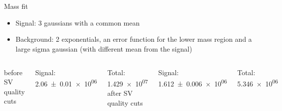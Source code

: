 \section{}

\begin{frame}{Mass fit}
	\begin{block}{}
		\begin{itemize}
			\item Signal: 3 gaussians with a common mean
			\item Background: 2 exponentials, an error function for the lower mass region and a large sigma gaussian (with different mean from the signal)
		\end{itemize}
	\end{block}
	\vspace{0.3cm}
	
	\begin{columns}[c]
			\centering
			before SV quality cuts
			
			
			Signal: \num{2.06 +- 0.01 e+06}
			
			Total: \num{1.429e+07}
			\centering
			after SV quality cuts
			
			
			Signal: \num{1.612 +- 0.006 e+06}
			
			Total: \num{5.346e+06}
	\end{columns}
\end{frame}

